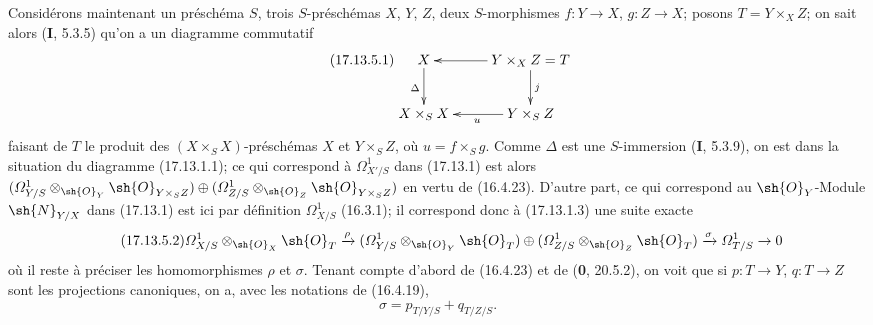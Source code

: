 \begin{env}[17.13.5]
\label{IV.17.13.5}
Considérons maintenant un préschéma $S$, trois $S$-préschémas $X$, $Y$, $Z$, deux $S$-morphismes $f:Y\to X$, $g:Z\to X$; posons $T=Y\times_XZ$; on sait alors (\textbf{I}, 5.3.5) qu'on a un diagramme commutatif
\[
\label{IV.17.13.5.1}
\tag{17.13.5.1}
\xymatrix{
  X \ar[d]_{\Delta} & Y\times_X Z=T \ar[l] \ar[d]^{j}\\
  X\times_S X & Y\times_S Z \ar[l]^{u}
}
\]
faisant de $T$ le produit des $(X\times_SX)$-préschémas $X$ et $Y\times_SZ$, où $u=f\times_Sg$. Comme $\Delta$ est une $S$-immersion (\textbf{I}, 5.3.9), on est dans la situation du diagramme (17.13.1.1); ce qui correspond à $\varOmega^1_{X'/S}$ dans (17.13.1) est alors $(\varOmega^1_{Y/S}\otimes_{\sh{O}_Y}\sh{O}_{Y\times_SZ})\oplus(\varOmega^1_{Z/S}\otimes_{\sh{O}_Z}\sh{O}_{Y\times_SZ})$ en vertu de (16.4.23). D'autre part, ce qui correspond au $\sh{O}_Y$-Module $\sh{N}_{Y/X}$ dans (17.13.1) est ici par définition $\varOmega^1_{X/S}$ (16.3.1); il correspond donc à (17.13.1.3) une suite exacte
\[
\label{IV.17.13.5.2}
\tag{17.13.5.2}
\varOmega^1_{X/S}\otimes_{\sh{O}_X}\sh{O}_T\xrightarrow{\rho}
(\varOmega^1_{Y/S}\otimes_{\sh{O}_Y}\sh{O}_T)\oplus
(\varOmega^1_{Z/S}\otimes_{\sh{O}_Z}\sh{O}_T)
\xrightarrow{\sigma}\varOmega^1_{T/S}\to0
\]
où il reste à préciser les homomorphismes $\rho$ et $\sigma$. Tenant compte d'abord de (16.4.23) et de (\textbf{0}, 20.5.2), on voit que si $p:T\to Y$, $q:T\to Z$ sont les projections canoniques, on a, avec les notations de (16.4.19),
\[
\label{IV.17.13.5.3}
\tag{17.13.5.3}
\sigma=p_{T/Y/S}+q_{T/Z/S}.
\]


\end{env}
